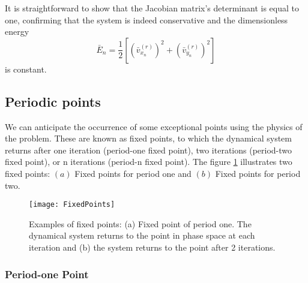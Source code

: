 \documentclass[reprint, aps, pre,nofootinbib]{revtex4-1}
\newcommand*\LyXZeroWidthSpace{\hspace{0pt}}
\begin{document}
\LyXZeroWidthSpace It is straightforward to show that the Jacobian
matrix's determinant is equal to one, confirming that the system is
indeed conservative and the dimensionless energy 
\begin{equation}
\bar{E}_{n}=\frac{1}{2}\left[\left(\bar{v}_{x_{n}}^{(r)}\right)^{2}+\left(\bar{v}_{y_{n}}^{(r)}\right)^{2}\right]\label{Energy}
\end{equation}
is constant.


\subsection{Periodic points \label{subsec:Periodic-points}}

We can anticipate the occurrence of some exceptional points using
the physics of the problem. These are known as fixed points, to which
the dynamical system returns after one iteration (period-one fixed
point), two iterations (period-two fixed point), or n iterations (period-n
fixed point). The figure \ref{FigFixedPoints} illustrates two fixed
points: $(a)$ Fixed points for period one and $(b)$ Fixed points
for period two.

\begin{figure}[H]
\centering{}\texttt{[image: FixedPoints]}\caption{Examples of fixed points: (a) Fixed point of period one. The dynamical
system returns to the point in phase space at each iteration and (b)
the system returns to the point after 2 iterations.}
\label{FigFixedPoints}
\end{figure}


\subsubsection{Period-one Point}
\end{document}
